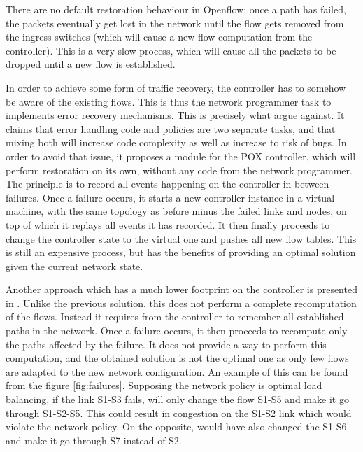 \documentclass[final]{IEEEtran}
\begin{document}
There are no default restoration behaviour in Openflow: once a path has failed, the packets eventually get lost in the network until the flow gets removed from the ingress switches (which will cause a new flow computation from the controller). This is a very slow process, which will cause all the packets to be dropped until a new flow is established.

In order to achieve some form of traffic recovery, the controller has to somehow be aware of the existing flows. This is thus the network programmer task to implements error recovery mechanisms. This is precisely what \cite{Kuzniar:2013:AFR:2491185.2491218} argue against. It claims that error handling code and policies are two separate tasks, and that mixing both will increase code complexity as well as increase to risk of bugs. In order to avoid that issue, it proposes a module for the POX controller, which will perform restoration on its own, without any code from the network programmer. The principle is to record all events happening on the controller in-between failures. Once a failure occurs, it starts a new controller instance in a virtual machine, with the same topology as before minus the failed links and nodes, on top of which it replays all events it has recorded. It then finally proceeds to change the controller state to the virtual one and pushes all new flow tables. This is still an expensive process, but has the benefits of providing an optimal solution given the current network state.

Another approach which has a much lower footprint on the controller is presented in \cite{2911632}. Unlike the previous solution, this does not perform a complete recomputation of the flows. Instead it requires from the controller to remember all established paths in the network. Once a failure occurs, it then proceeds to recompute only the paths affected by the failure. It does not provide a way to perform this computation, and the obtained solution is not the optimal one as only few flows are adapted to the new network configuration. An example of this can be found from the figure \ref{fig:failures}. Supposing the network policy is optimal load balancing, if the link S1-S3 fails, \cite{2911632} will only change the flow S1-S5 and make it go through S1-S2-S5. This could result in congestion on the S1-S2 link which would violate the network policy. On the opposite, \cite{Kuzniar:2013:AFR:2491185.2491218} would have also changed the S1-S6 and make it go through S7 instead of S2.
\end{document}
